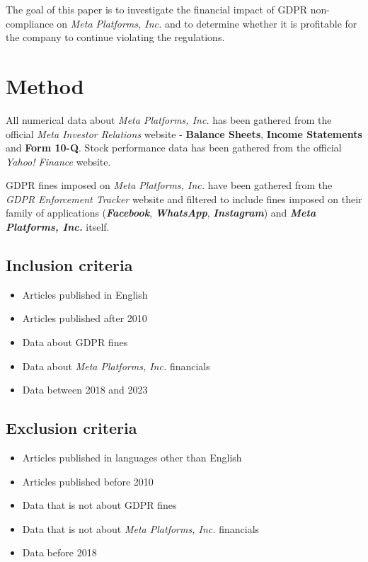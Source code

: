 \documentclass[12pt, a4paper]{article}
\begin{document}
The goal of this paper is to investigate the financial impact of GDPR
non-compliance on \textit{Meta Platforms, Inc.} and to determine whether it is
profitable for the company to continue violating the regulations.

\section*{Method}

All numerical data about \textit{Meta Platforms, Inc.} has been gathered from
the official \textit{Meta Investor Relations} website\cite{fbMetaFinancials} -
\textbf{Balance Sheets}, \textbf{Income Statements} and \textbf{Form 10-Q}.
Stock performance data has been gathered from the official \textit{Yahoo!
Finance} website\cite{stockPrice}.

GDPR fines imposed on \textit{Meta Platforms, Inc.} have been gathered from the
\textit{GDPR Enforcement Tracker}
website\cite{enforcementtrackerGDPREnforcement} and filtered to include fines
imposed on their family of applications (\textbf{\textit{Facebook}},
\textbf{\textit{WhatsApp}}, \textbf{\textit{Instagram}}) and
\textbf{\textit{Meta Platforms, Inc.}} itself.

\subsection*{Inclusion criteria}

\begin{itemize}
    \item Articles published in English
    \item Articles published after 2010
    \item Data about GDPR fines
    \item Data about \textit{Meta Platforms, Inc.} financials
    \item Data between 2018 and 2023
\end{itemize}

\subsection*{Exclusion criteria}

\begin{itemize}
    \item Articles published in languages other than English
    \item Articles published before 2010
    \item Data that is not about GDPR fines
    \item Data that is not about \textit{Meta Platforms, Inc.} financials
    \item Data before 2018
\end{itemize}
\end{document}
